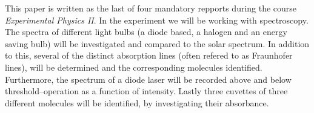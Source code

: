 This paper is written as the last of four mandatory repports during the course
\emph{Experimental Physics II}. In the experiment we will be working with
spectroscopy. The spectra of different light bulbs (a diode based, a halogen
and an energy saving bulb) will be investigated and compared to the solar
spectrum. In addition to this, several of the distinct absorption lines (often
refered to as Fraunhofer lines), will be determined and the corresponding molecules
identified. Furthermore, the spectrum of a diode laser will be recorded above and below
threshold--operation as a function of intensity. Lastly three
cuvettes of three different molecules will be identified, by investigating
their absorbance.

